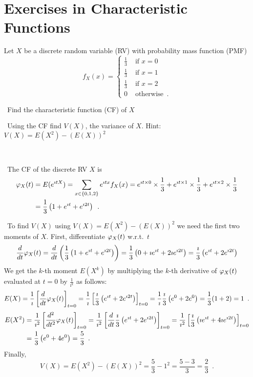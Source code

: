 \section{Exercises in Characteristic Functions}\label{S:xsCFs}%
\begin{ExerciseList}
\Exercise
Let $X$ be a discrete random variable (RV) with probability mass function (PMF)
\[
f_X(x) = 
\begin{cases}
\frac{1}{3} & \text{ if } x=0\\
\frac{1}{3} & \text{ if } x=1\\
\frac{1}{3} & \text{ if } x=2\\
0 & \text{ otherwise} \enspace .
\end{cases}
\]
\be
\item~Find the characteristic function (CF) of $X$
\item~Using the CF find $V(X)$, the variance of $X$. {Hint: $V(X)=E(X^2)-(E(X))^2$}
\ee

\Answer
~\\
\be
\item~The CF of the discrete RV $X$ is
\begin{align*}
\varphi_X(t) 
&= E(e^{\imath t X}) = \sum_{x\in\{0,1,2\}} e^{\imath t x} f_X(x)
= e^{\imath t \times 0} \times \frac{1}{3} + e^{\imath t \times 1} \times \frac{1}{3}+e^{\imath t \times 2} \times \frac{1}{3}\\
&= \frac{1}{3} \left(1+e^{\imath t} + e^{\imath 2 t}\right) \enspace .
\end{align*}

\item~To find $V(X)$ using $V(X)=E(X^2)-(E(X))^2$ we need the first two moments of $X$.  First, differentiate $\varphi_X(t)$ w.r.t.~$t$
\begin{align*}
\frac{d}{dt}\varphi_X(t)
= \frac{d}{dt} \left( \frac{1}{3} \left(1+e^{\imath t} + e^{\imath 2 t}\right) \right)
= \frac{1}{3} \left(0+ \imath e^{\imath t} + 2 \imath e^{\imath 2 t} \right)
= \frac{\imath}{3} \left(e^{\imath t} + 2 e^{\imath 2 t} \right)
\end{align*}
We get the $k$-th moment $E(X^k)$ by multiplying the $k$-th derivative of $\varphi_X(t)$ evaluated at $t=0$ by $\frac{1}{\imath^k}$ as follows:
\begin{align*}
E(X) 
= \frac{1}{\imath} \left[ \frac{d}{dt}\varphi_X(t) \right]_{t=0} 
= \frac{1}{\imath} \left[ \frac{\imath}{3} \left(e^{\imath t} + 2 e^{\imath 2 t} \right)\right]_{t=0} 
= \frac{1}{\imath} \frac{\imath}{3} \left(e^0+2e^0\right) = \frac{1}{3}(1+2)=1 \enspace .
\end{align*}
\begin{align*}
E(X^2) 
&= \frac{1}{\imath^2} \left[ \frac{d^2}{dt^2}\varphi_X(t) \right]_{t=0} 
= \frac{1}{\imath^2} \left[ \frac{d}{dt} \frac{\imath}{3} \left(e^{\imath t} + 2 e^{\imath 2 t} \right) \right]_{t=0}
= \frac{1}{\imath^2} \left[ \frac{\imath}{3} \left(\imath e^{\imath t} + 4 \imath e^{\imath 2 t} \right) \right]_{t=0}\\
& = \frac{1}{3} \left(e^0 + 4 e^0\right) = \frac{5}{3} \enspace .
\end{align*}
Finally,
\[
V(X) = E(X^2)-(E(X))^2 = \frac{5}{3} - 1^2 = \frac{5-3}{3}=\frac{2}{3} \enspace .
\] 
\ee


\end{ExerciseList}
